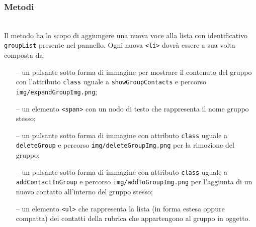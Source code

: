 \subsubsection*{Metodi}
\begin{description}
  
  \item{}\\
  Il metodo ha lo scopo di aggiungere una nuova voce alla lista con identificativo \verb'groupList' presente nel pannello. Ogni nuova \verb'<li>' dovrà essere a sua volta composta da:
  \begin{itemize}
    \item[--] un pulsante sotto forma di immagine per mostrare il contenuto del gruppo con l'attributo \texttt{class} uguale a \texttt{showGroupContacts} e percorso \texttt{img/expandGroupImg.png};
    \item[--] un elemento \verb'<span>' con un nodo di testo  che rappresenta il nome gruppo stesso;
    \item[--] un pulsante sotto forma di immagine con attributo \texttt{class} uguale a \texttt{deleteGroup} e percorso \texttt{img/deleteGroupImg.png} per la rimozione del gruppo;
    \item[--] un pulsante sotto forma di immagine con attributo \texttt{class} uguale a \texttt{addContactInGroup} e percorso \texttt{img/addToGroupImg.png} per l'aggiunta di un nuovo contatto all'interno del gruppo stesso;
    \item[--] un elemento \verb'<ul>' che rappresenta la lista (in forma estesa oppure compatta) dei contatti della rubrica che appartengono al gruppo in oggetto.
  \end{itemize}
  

\end{description}
